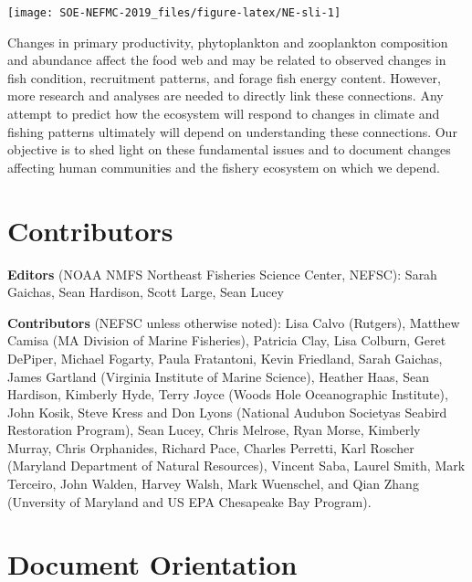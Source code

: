 \documentclass[10pt,]{article}
\let\origfigure\figure
\let\endorigfigure\endfigure
\renewenvironment{figure}[1][2] {
    \expandafter\origfigure\expandafter[H]
} {
    \endorigfigure
}
\begin{document}
\begin{figure}

{\centering \texttt{[image: SOE-NEFMC-2019\_files/figure-latex/NE-sli-1]} 

}

\caption{GOM and GB small-large zooplankton index and the annual primary production anomaly.}\label{fig:NE-sli}
\end{figure}

Changes in primary productivity, phytoplankton and zooplankton
composition and abundance affect the food web and may be related to
observed changes in fish condition, recruitment patterns, and forage
fish energy content. However, more research and analyses are needed to
directly link these connections. Any attempt to predict how the
ecosystem will respond to changes in climate and fishing patterns
ultimately will depend on understanding these connections. Our objective
is to shed light on these fundamental issues and to document changes
affecting human communities and the fishery ecosystem on which we
depend.

\section{Contributors}\label{contributors}

\textbf{Editors} (NOAA NMFS Northeast Fisheries Science Center, NEFSC):
Sarah Gaichas, Sean Hardison, Scott Large, Sean Lucey

\textbf{Contributors} (NEFSC unless otherwise noted): Lisa Calvo
(Rutgers), Matthew Camisa (MA Division of Marine Fisheries), Patricia
Clay, Lisa Colburn, Geret DePiper, Michael Fogarty, Paula Fratantoni,
Kevin Friedland, Sarah Gaichas, James Gartland (Virginia Institute of
Marine Science), Heather Haas, Sean Hardison, Kimberly Hyde, Terry Joyce
(Woods Hole Oceanographic Institute), John Kosik, Steve Kress and Don
Lyons (National Audubon Societyas Seabird Restoration Program), Sean
Lucey, Chris Melrose, Ryan Morse, Kimberly Murray, Chris Orphanides,
Richard Pace, Charles Perretti, Karl Roscher (Maryland Department of
Natural Resources), Vincent Saba, Laurel Smith, Mark Terceiro, John
Walden, Harvey Walsh, Mark Wuenschel, and Qian Zhang (Unversity of
Maryland and US EPA Chesapeake Bay Program).

\newpage 

\section{Document Orientation}\label{document-orientation}
\end{document}
